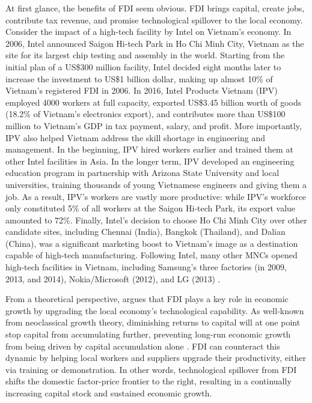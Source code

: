 At first glance, the benefits of FDI seem obvious. FDI brings capital, create
jobs, contribute tax revenue, and promise technological spillover to the local
economy. Consider the impact of a high-tech facility by Intel on Vietnam's
economy. In 2006, Intel announced Saigon Hi-tech Park in Ho Chi Minh City,
Vietnam as the site for its largest chip testing and assembly in the world.
Starting from the initial plan of a US\$300 million facility, Intel decided
eight months later to increase the investment to US\$1 billion dollar, making up
almost 10\% of Vietnam's registered FDI in 2006. In 2016, Intel Products Vietnam
(IPV) employed 4000 workers at full capacity, exported US\$3.45 billion worth of
goods (18.2\% of Vietnam's electronics export), and contributes more than
US\$100 million to Vietnam's GDP in tax payment, salary, and profit. More
importantly, IPV also helped Vietnam address the skill shortage in engineering
and management. In the beginning, IPV hired workers earlier and trained them at
other Intel facilities in Asia. In the longer term, IPV developed an engineering
education program in partnership with Arizona State University and local
universities, training thousands of young Vietnamese engineers and giving them a
job. As a result, IPV's workers are vastly more productive: while IPV's
workforce only constituted 5\% of all workers at the Saigon Hi-tech Park, its
export value amounted to 72\%. Finally, Intel's decision to choose Ho Chi Minh
City over other candidate sites, including Chennai (India), Bangkok (Thailand),
and Dalian (China), was a significant marketing boost to Vietnam's image as a
destination capable of high-tech manufacturing. Following Intel, many other MNCs
opened high-tech facilities in Vietnam, including Samsung's three factories (in
2009, 2013, and 2014), Nokia/Microsoft (2012), and LG (2013) \citep{Dinh2016,
  UNCTAD2008}.

From a theoretical perspective, \citet{Findlay1978} argues that FDI plays a key
role in economic growth by upgrading the local economy's technological capability. As
well-known from neoclassical growth theory, diminishing returns to capital will
at one point stop capital from accumulating further, preventing long-run
economic growth from being driven by capital accumulation alone
\citep{Solow1956}. FDI can counteract this dynamic by helping local workers and
suppliers upgrade their productivity, either via training or demonstration.
In other words, technological spillover from FDI shifts the domestic factor-price
frontier to the right, resulting in a continually increasing capital stock and
sustained economic growth.

